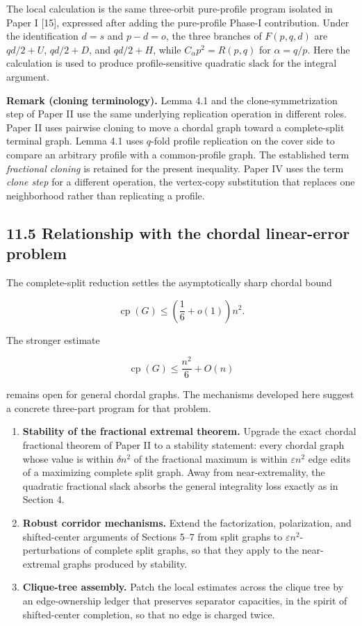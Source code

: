 \documentclass[
  11pt,
]{article}
\begin{document}
The local calculation is the same three-orbit pure-profile program
isolated in Paper I {[}15{]}, expressed after adding the pure-profile
Phase-I contribution. Under the identification \(d=s\) and \(p-d=o\),
the three branches of \(F(p,q,d)\) are \(qd/2+U\), \(qd/2+D\), and
\(qd/2+H\), while \(C_\alpha p^2=R(p,q)\) for \(\alpha=q/p\). Here the
calculation is used to produce profile-sensitive quadratic slack for the
integral argument.

\textbf{Remark (cloning terminology).} Lemma 4.1 and the
clone-symmetrization step of Paper II use the same underlying
replication operation in different roles. Paper II uses pairwise cloning
to move a chordal graph toward a complete-split terminal graph. Lemma
4.1 uses \(q\)-fold profile replication on the cover side to compare an
arbitrary profile with a common-profile graph. The established term
\emph{fractional cloning} is retained for the present inequality. Paper
IV uses the term \emph{clone step} for a different operation, the
vertex-copy substitution that replaces one neighborhood rather than
replicating a profile.

\subsection{11.5 Relationship with the chordal linear-error
problem}\label{relationship-with-the-chordal-linear-error-problem}

The complete-split reduction settles the asymptotically sharp chordal
bound

\[
\operatorname{cp}(G)
\le
\left(\frac16+o(1)\right)n^2.
\]

The stronger estimate

\[
\operatorname{cp}(G)
\le
\frac{n^2}{6}+O(n)
\]

remains open for general chordal graphs. The mechanisms developed here
suggest a concrete three-part program for that problem.

\begin{enumerate}
\def\labelenumi{\arabic{enumi}.}
\item
  \textbf{Stability of the fractional extremal theorem.} Upgrade the
  exact chordal fractional theorem of Paper II to a stability statement:
  every chordal graph whose value is within \(\delta n^2\) of the
  fractional maximum is within \(\varepsilon n^2\) edge edits of a
  maximizing complete split graph. Away from near-extremality, the
  quadratic fractional slack absorbs the general integrality loss
  exactly as in Section 4.
\item
  \textbf{Robust corridor mechanisms.} Extend the factorization,
  polarization, and shifted-center arguments of Sections 5--7 from split
  graphs to \(\varepsilon n^2\)-perturbations of complete split graphs,
  so that they apply to the near-extremal graphs produced by stability.
\item
  \textbf{Clique-tree assembly.} Patch the local estimates across the
  clique tree by an edge-ownership ledger that preserves separator
  capacities, in the spirit of shifted-center completion, so that no
  edge is charged twice.
\end{enumerate}
\end{document}
